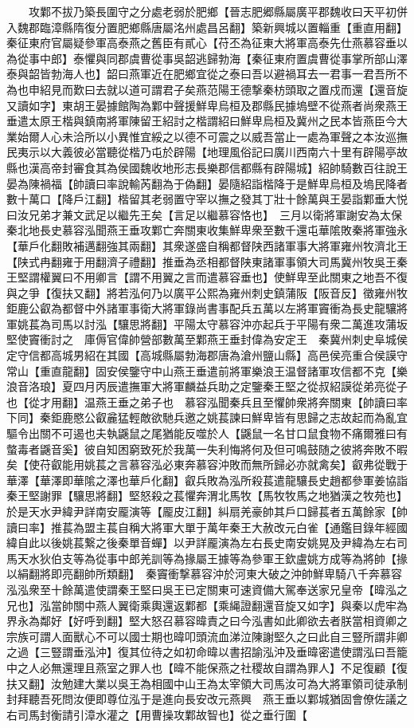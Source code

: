 　　攻鄴不拔乃築長圍守之分處老弱於肥鄉【晉志肥郷縣屬廣平郡魏收曰天平初併入魏郡臨漳縣隋復分置肥鄉縣唐屬洺州處昌呂翻】築新興城以置輜重【重直用翻】　秦征東府官屬疑參軍高泰燕之舊臣有貳心【苻丕為征東大將軍高泰先仕燕慕容垂以為從事中郎】泰懼與同郡虞曹從事吳韶逃歸勃海【秦征東府置虞曹從事掌所部山澤泰與韶皆勃海人也】韶曰燕軍近在肥鄉宜從之泰曰吾以避禍耳去一君事一君吾所不為也申紹見而歎曰去就以道可謂君子矣燕范陽王德撃秦枋頭取之置戍而還【還音旋又讀如字】東胡王晏據館陶為鄴中聲援鮮卑烏桓及郡縣民據塢壁不從燕者尚衆燕王垂遣太原王楷與鎮南將軍陳留王紹討之楷謂紹曰鮮卑烏桓及冀州之民本皆燕臣今大業始爾人心未洽所以小異惟宜綏之以德不可震之以威吾當止一處為軍聲之本汝巡撫民夷示以大義彼必當聽從楷乃屯於辟陽【地理風俗記曰廣川西南六十里有辟陽亭故縣也漢高帝封審食其為侯國魏收地形志長樂郡信都縣有辟陽城】紹帥騎數百往說王晏為陳禍福【帥讀曰率說輸芮翻為于偽翻】晏隨紹詣楷降于是鮮卑烏桓及塢民降者數十萬口【降戶江翻】楷留其老弱置守宰以撫之發其丁壯十餘萬與王晏詣鄴垂大悦曰汝兄弟才兼文武足以繼先王矣【言足以繼慕容恪也】　三月以衛將軍謝安為太保　秦北地長史慕容泓聞燕王垂攻鄴亡奔關東收集鮮卑衆至數千還屯華隂敗秦將軍強永【華戶化翻敗補邁翻強其兩翻】其衆遂盛自稱都督陕西諸軍事大將軍雍州牧濟北王【陕式冉翻雍于用翻濟子禮翻】推垂為丞相都督陕東諸軍事領大司馬冀州牧吳王秦王堅謂權翼曰不用卿言【謂不用翼之言而遣慕容垂也】使鮮卑至此關東之地吾不復與之爭【復扶又翻】將若泓何乃以廣平公熙為雍州刺史鎮蒲阪【阪音反】徵雍州牧鉅鹿公叡為都督中外諸軍事衛大將軍錄尚書事配兵五萬以左將軍竇衝為長史龍驤將軍姚萇為司馬以討泓【驤思將翻】平陽太守慕容沖亦起兵于平陽有衆二萬進攻蒲坂堅使竇衝討之　庫傉官偉帥營部數萬至鄴燕王垂封偉為安定王　秦冀州刺史阜城侯定守信都高城男紹在其國【高城縣屬勃海郡唐為滄州鹽山縣】高邑侯亮重合侯謨守常山【重直龍翻】固安侯鑒守中山燕王垂遣前將軍樂浪王温督諸軍攻信都不克【樂浪音洛琅】夏四月丙辰遣撫軍大將軍麟益兵助之定鑒秦王堅之從叔紹謨從弟亮從子也【從才用翻】温燕王垂之弟子也　慕容泓聞秦兵且至懼帥衆將奔關東【帥讀曰率下同】秦鉅鹿愍公叡麄猛輕敵欲馳兵邀之姚萇諫曰鮮卑皆有思歸之志故起而為亂宜驅令出關不可遏也夫執鼷鼠之尾猶能反噬於人【鼷鼠一名甘口鼠食物不痛爾雅曰有螫毒者鼷音奚】彼自知困窮致死於我萬一失利悔將何及但可鳴鼓随之彼將奔敗不暇矣【使苻叡能用姚萇之言慕容泓必東奔慕容沖敗而無所歸必亦就禽矣】叡弗從戰于華澤【華澤即華隂之澤也華戶化翻】叡兵敗為泓所殺萇遣龍驤長史趙都參軍姜協詣秦王堅謝罪【驤思將翻】堅怒殺之萇懼奔渭北馬牧【馬牧牧馬之地猶漢之牧苑也】於是天水尹緯尹詳南安龎演等【龎皮江翻】糾扇羌豪帥其戶口歸萇者五萬餘家【帥讀曰率】推萇為盟主萇自稱大將軍大單于萬年秦王大赦改元白雀【通鑑目錄年經國緯自此以後姚萇繋之後秦單音蟬】以尹詳龎演為左右長史南安姚晃及尹緯為左右司馬天水狄伯支等為從事中郎羌訓等為掾屬王據等為參軍王欽盧姚方成等為將帥【掾以絹翻將即亮翻帥所類翻】　秦竇衝撃慕容沖於河東大破之沖帥鮮卑騎八千奔慕容泓泓衆至十餘萬遣使謂秦王堅曰吳王已定關東可速資備大駕奉送家兄皇帝【暐泓之兄也】泓當帥關中燕人翼衛乘輿還返鄴都【乘䋲證翻還音旋又如字】與秦以虎牢為界永為鄰好【好呼到翻】堅大怒召慕容暐責之曰今泓書如此卿欲去者朕當相資卿之宗族可謂人面獸心不可以國士期也暐叩頭流血涕泣陳謝堅久之曰此自三豎所謂非卿之過【三豎謂垂泓沖】復其位待之如初命暐以書招諭泓沖及垂暐密遣使謂泓曰吾籠中之人必無還理且燕室之罪人也【暐不能保燕之社稷故自謂為罪人】不足復顧【復扶又翻】汝勉建大業以吳王為相國中山王為太宰領大司馬汝可為大將軍領司徒承制封拜聽吾死問汝便即尊位泓于是進向長安改元燕興　燕王垂以鄴城猶固會僚佐議之右司馬封衡請引漳水灌之【用曹操攻鄴故智也】從之垂行圍【